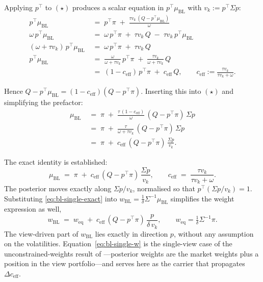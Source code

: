 \documentclass[a4paper,11pt]{article}
\theoremstyle{plain}
\theoremstyle{definition}
\newcommand{\muBL}{\mu_{\mathrm{BL}}}
\newcommand{\eff}{\mathrm{eff}}
\begin{document}
Applying $p^\top$ to $(\star)$ produces a scalar equation in
$p^\top\muBL$ with $v_k := p^\top\Sigma p$:
\begin{align*}
  p^\top\muBL \;&=\; p^\top\pi \;+\; \tfrac{\tau v_k\,(Q - p^\top\muBL)}{\omega}\\
  \omega\,p^\top\muBL \;&=\; \omega\,p^\top\pi \;+\; \tau v_k\,Q \;-\; \tau v_k\,p^\top\muBL\\
  (\omega + \tau v_k)\,p^\top\muBL \;&=\; \omega\,p^\top\pi \;+\; \tau v_k\,Q\\
  p^\top\muBL \;&=\; \tfrac{\omega}{\omega + \tau v_k}\,p^\top\pi \;+\; \tfrac{\tau v_k}{\omega + \tau v_k}\,Q\\
  \;&=\; (1 - c_{\eff})\,p^\top\pi \;+\; c_{\eff}\,Q,
  \qquad c_{\eff} := \tfrac{\tau v_k}{\tau v_k + \omega}.
\end{align*}

Hence $Q - p^\top\muBL = (1-c_{\eff})(Q - p^\top\pi)$. Inserting this
into $(\star)$ and simplifying the prefactor:
\begin{align*}
  \muBL \;&=\; \pi \;+\; \tfrac{\tau\,(1 - c_{\eff})}{\omega}\,(Q - p^\top\pi)\,\Sigma p\\
  \;&=\; \pi \;+\; \tfrac{\tau}{\omega + \tau v_k}\,(Q - p^\top\pi)\,\Sigma p\\
  \;&=\; \pi \;+\; c_{\eff}\,(Q - p^\top\pi)\,\tfrac{\Sigma p}{v_k}.
\end{align*}

The exact identity is established:
\begin{equation}
\label{eq:bl-single-exact}
  \muBL \;=\; \pi \;+\; c_{\eff}\,(Q - p^\top\pi)\,\frac{\Sigma p}{v_k},
  \qquad c_{\eff} \;=\; \frac{\tau v_k}{\tau v_k + \omega}.
\end{equation}
The posterior moves exactly along $\Sigma p / v_k$, normalised so that
$p^\top(\Sigma p / v_k) = 1$. Substituting \eqref{eq:bl-single-exact}
into $w_{\mathrm{BL}} = \tfrac{1}{\delta}\Sigma^{-1}\muBL$ simplifies
the weight expression as well,
\begin{equation}
\label{eq:bl-single-w}
  w_{\mathrm{BL}} \;=\; w_{\mathrm{eq}} \;+\; c_{\eff}\,(Q - p^\top\pi)\,\frac{p}{\delta\,v_k},
  \qquad w_{\mathrm{eq}} = \tfrac{1}{\delta}\Sigma^{-1}\pi.
\end{equation}
The view-driven part of $w_{\mathrm{BL}}$ lies exactly in direction
$p$, without any assumption on the volatilities.
Equation~\eqref{eq:bl-single-w} is the single-view case of the
unconstrained-weights result of \citet{HeLitterman1999}---posterior
weights are the market weights plus a position in the view
portfolio---and serves here as the carrier that propagates
$\Delta c_{\eff}$.
\end{document}
